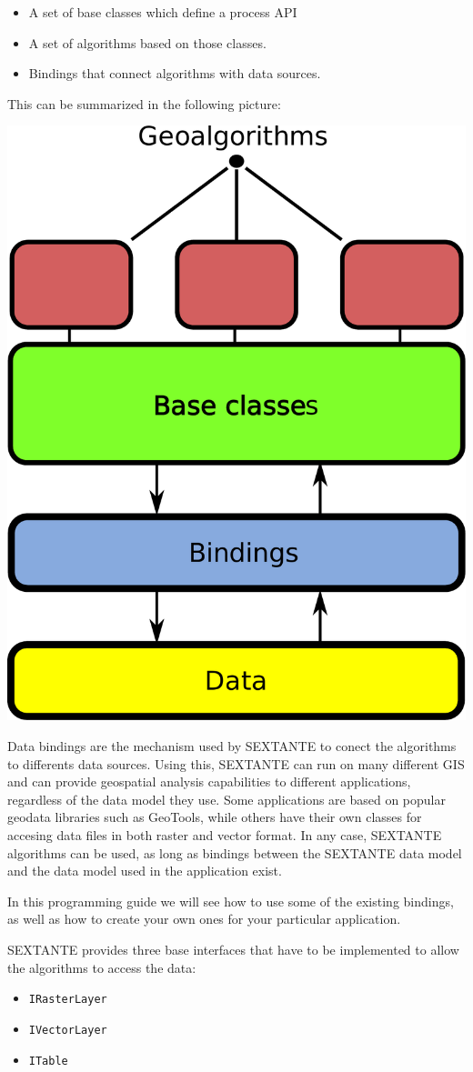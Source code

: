 \begin{itemize}
 \item A set of base classes which define a process API
\item A set of algorithms based on those classes.
\item Bindings that connect algorithms with data sources.
\end{itemize}

This can be summarized in the following picture:

\begin{center}
 \includegraphics[width=.5\textwidth]{architecture.pdf} 
\end{center}

Data bindings are the mechanism used by SEXTANTE to conect the algorithms to differents data sources. Using this, SEXTANTE can run on many different GIS and can provide geospatial analysis capabilities to different applications, regardless of the data model they use. Some applications are based on popular geodata libraries such as GeoTools, while others have their own classes for accesing data files in both raster and vector format. In any case, SEXTANTE algorithms can be used, as long as bindings between the SEXTANTE data model and the data model used in the application exist.

In this programming guide we will see how to use some of the existing bindings, as well as how to create your own ones for your particular application.

SEXTANTE provides three base interfaces that have to be implemented to allow the algorithms to access the data:

\begin{itemize}
 \item \texttt{IRasterLayer}
\item \texttt{IVectorLayer}
\item \texttt{ITable}
\end{itemize}

